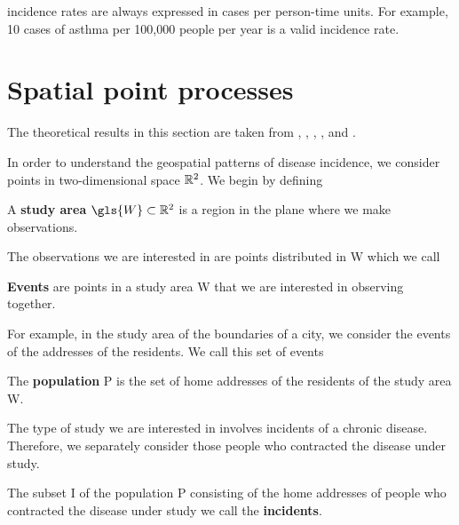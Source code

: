 \Glspl{incidence rate} are always expressed in cases per person-time units.
For example, 10 cases of asthma per 100,000 people per year is a valid \gls{incidence rate}.

%
%
\section{Spatial point processes}
\label{sec:theory:spatial_point_processes}

The theoretical results in this section are taken from \citet{diggle1983spatial},
\citet{diggle1988equivalence},
\citet{guan2008consistent},
\citet{silverman1986density},
and \citet{wand1994kernel}.

In order to understand the geospatial patterns of disease incidence,
we consider points in two-dimensional space $\mathbb{R}^2$.
We begin by defining

\begin{defn}
    A \textbf{study area} $\gls{W} \subset \RS$ is a region in the plane where we make observations.
\end{defn}

The observations we are interested in are points distributed in \gls{W} which we call

\begin{defn}
    \textbf{Events} are points in a study area \gls{W} that we are interested in observing together.
\end{defn}

For example, in the study area of the boundaries of a city, we consider the events of the addresses of the residents.
We call this set of events

\begin{defn}
    The \textbf{population} \gls{P} is the set of home addresses of the residents of the study area \gls{W}.
\end{defn}

The type of study we are interested in involves incidents of a chronic disease.
Therefore, we separately consider those people who contracted the disease under study.

\begin{defn}
    The subset \gls{I} of the population \gls{P} consisting of the home addresses of people who contracted the disease under study we call the \textbf{incidents}.
\end{defn}

